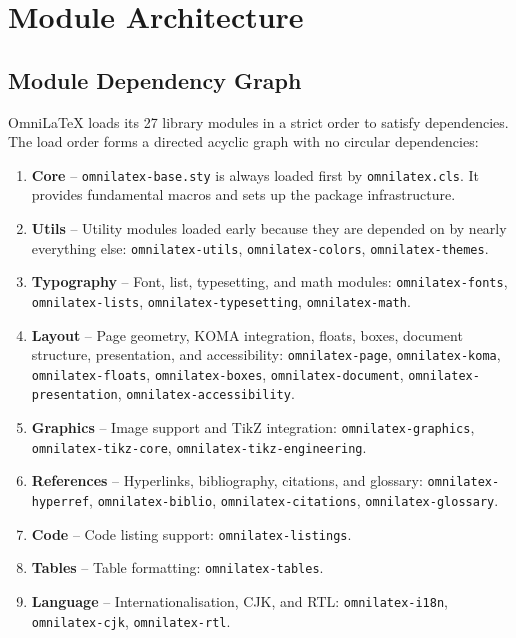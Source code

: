\chapter{Module Architecture}
\label{ch:architecture}

\section{Module Dependency Graph}

OmniLaTeX loads its 27 library modules in a strict order to satisfy
dependencies.  The load order forms a directed acyclic graph with no
circular dependencies:

\begin{enumerate}
  \item \textbf{Core} -- \texttt{omnilatex-base.sty} is always loaded
        first by \texttt{omnilatex.cls}.  It provides fundamental macros
        and sets up the package infrastructure.

  \item \textbf{Utils} -- Utility modules loaded early because they are
        depended on by nearly everything else:
        \texttt{omnilatex-utils}, \texttt{omnilatex-colors},
        \texttt{omnilatex-themes}.

  \item \textbf{Typography} -- Font, list, typesetting, and math modules:
        \texttt{omnilatex-fonts}, \texttt{omnilatex-lists},
        \texttt{omnilatex-typesetting}, \texttt{omnilatex-math}.

  \item \textbf{Layout} -- Page geometry, KOMA integration, floats,
        boxes, document structure, presentation, and accessibility:
        \texttt{omnilatex-page}, \texttt{omnilatex-koma},
        \texttt{omnilatex-floats}, \texttt{omnilatex-boxes},
        \texttt{omnilatex-document}, \texttt{omnilatex-presentation},
        \texttt{omnilatex-accessibility}.

  \item \textbf{Graphics} -- Image support and TikZ integration:
        \texttt{omnilatex-graphics}, \texttt{omnilatex-tikz-core},
        \texttt{omnilatex-tikz-engineering}.

  \item \textbf{References} -- Hyperlinks, bibliography, citations, and
        glossary: \texttt{omnilatex-hyperref}, \texttt{omnilatex-biblio},
        \texttt{omnilatex-citations}, \texttt{omnilatex-glossary}.

  \item \textbf{Code} -- Code listing support:
        \texttt{omnilatex-listings}.

  \item \textbf{Tables} -- Table formatting:
        \texttt{omnilatex-tables}.

  \item \textbf{Language} -- Internationalisation, CJK, and RTL:
        \texttt{omnilatex-i18n}, \texttt{omnilatex-cjk},
        \texttt{omnilatex-rtl}.
\end{enumerate}

